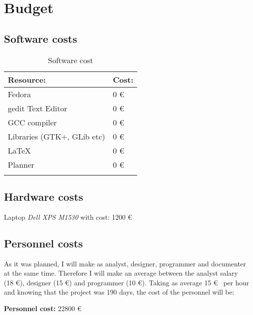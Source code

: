 
\chapter{Budget}

\section{Software costs}\label{sec:SoftwareCosts}

\begin{table}[H]
  \begin{center}
    \begin{tabularx}{0.75\textwidth}{|X|X|}
      \firsthline
      \textbf{Resource:} & \textbf{Cost:} \\
      \hline
      Fedora & 0 \euro \\
      \hline
      gedit Text Editor & 0 \euro \\
      \hline
      GCC compiler & 0 \euro \\
      \hline
      Libraries (GTK+, GLib etc) & 0 \euro \\
      \hline
      \LaTeX & 0 \euro \\
      \hline
      Planner & 0 \euro \\
      \lasthline
    \end{tabularx}
    \caption{Software cost}
  \end{center}
\end{table}

\section{Hardware costs}\label{sec:HardwareCosts}

Laptop \emph{Dell XPS M1530} with cost: 1200 \euro

\newpage
\section{Personnel costs}\label{sec:PersonnelCosts}

As it was planned, I will make as analyst, designer, programmer and documenter at the same time. Therefore I will make an average between the analyst salary (18 \euro), designer (15 \euro) and programmer (10 \euro). Taking as average 15 \euro~ per hour and knowing that the project was 190 days, the cost of the personnel will be:

\textbf{Personnel cost:} 22800 \euro
